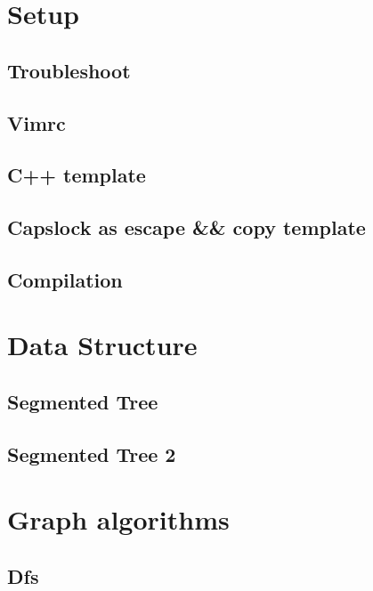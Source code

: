 \section{Setup}
\subsection{Troubleshoot}
\raggedbottom
\hrulefill
\subsection{Vimrc}
\raggedbottom
\hrulefill
\subsection{C++ template}
\raggedbottom
\hrulefill
\subsection{Capslock as escape \&\& copy template}
\raggedbottom
\hrulefill
\subsection{Compilation}
\raggedbottom
\hrulefill


\section{Data Structure}
\subsection{Segmented Tree}
\raggedbottom
\hrulefill
\subsection{Segmented Tree 2}
\raggedbottom
\hrulefill
\raggedbottom
\hrulefill

\section{Graph algorithms}
\subsection{Dfs}
\raggedbottom
\hrulefill
